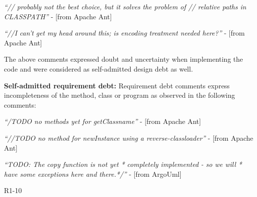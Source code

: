 {\vspace{1mm}
    \begin{displayquote}
        \textit{``// probably not the best choice, but it solves the problem of // relative paths in CLASSPATH''} - [from Apache Ant]
    \end{displayquote}
    \vspace{1mm}
    \begin{displayquote}   
        \textit{``//I can't get my head around this; is encoding treatment needed here?''} - [from Apache Ant]
    \end{displayquote}
  \vspace{1mm}
The above comments expressed doubt and uncertainty when implementing the code and were considered as self-admitted design debt as well.

\vspace{1mm}
\noindent\textbf{Self-admitted requirement debt:} Requirement debt comments express incompleteness of the method, class or program as observed in the following comments:

\vspace{1mm}
    \begin{displayquote}
        \textit{``/TODO no methods yet for getClassname''} - [from Apache Ant]
    \end{displayquote}
    \vspace{1mm}
    \begin{displayquote}
        \textit{``//TODO no method for newInstance using a reverse-classloader''} - [from Apache Ant]
    \end{displayquote}
    \vspace{1mm}
    \begin{displayquote}
        \textit{``TODO: The copy function is not yet * completely implemented - so we will  * have some exceptions here and there.*/''} - [from ArgoUml]  
    \end{displayquote}
\vspace{1mm}  

}{R1-10}

